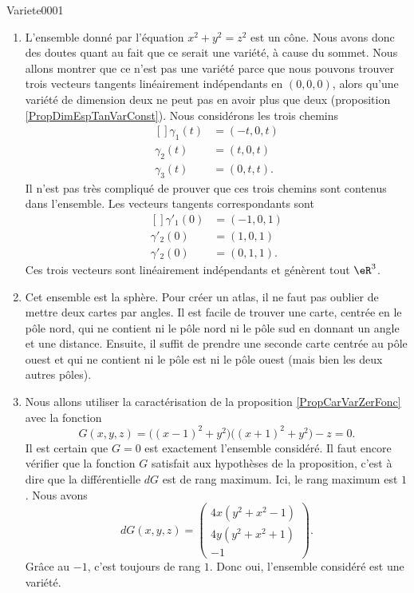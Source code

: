\begin{corrige}{Variete0001}
\begin{enumerate}
		\item
			L'ensemble donné par l'équation $x^2+y^2=z^2$ est un cône. Nous avons donc des doutes quant au fait que ce serait une variété, à cause du sommet.
			Nous allons montrer que ce n'est pas une variété parce que nous pouvons trouver trois vecteurs tangents linéairement indépendants en $(0,0,0)$, alors qu'une variété de dimension deux ne peut pas en avoir plus que deux (proposition \ref{PropDimEspTanVarConst}). Nous considérons les trois chemins
			\begin{equation}
				\begin{aligned}[]
					\gamma_1(t)&=(-t,0,t)\\
					\gamma_2(t)&=(t,0,t)\\
					\gamma_3(t)&=(0,t,t).
				\end{aligned}
			\end{equation}
			Il n'est pas très compliqué de prouver que ces trois chemins sont contenus dans l'ensemble. Les vecteurs tangents correspondants sont
			\begin{equation}
				\begin{aligned}[]
					\gamma'_1(0)&=(-1,0,1)\\
					\gamma'_2(0)&=(1,0,1)\\
					\gamma'_2(0)&=(0,1,1).
				\end{aligned}
			\end{equation}
			Ces trois vecteurs sont linéairement indépendants et génèrent tout $\eR^3$.

		\item
			Cet ensemble est la sphère. Pour créer un atlas, il ne faut pas oublier de mettre deux cartes par angles. Il est facile de trouver une carte, centrée en le pôle nord, qui ne contient ni le pôle nord ni le pôle sud en donnant un angle et une distance. Ensuite, il suffit de prendre une seconde carte centrée au pôle ouest et qui ne contient ni le pôle est ni le pôle ouest (mais bien les deux autres pôles).

		\item
			Nous allons utiliser la caractérisation de la proposition \ref{PropCarVarZerFonc} avec la fonction
			\begin{equation}
				G(x,y,z)=\big( (x-1)^2+y^2 \big)\big( (x+1)^2+y^2 \big)-z=0.
			\end{equation}
			Il est certain que $G=0$ est exactement l'ensemble considéré. Il faut encore vérifier que la fonction $G$ satisfait aux hypothèses de la proposition, c'est à dire que la différentielle $dG$ est de rang maximum. Ici, le rang maximum est $1$. Nous avons
			\begin{equation}
				dG(x,y,z)=
				\begin{pmatrix}
					4x(y^2+x^2-1)	\\ 
					4y(y^2+x^2+1)	\\ 
					-1	
				\end{pmatrix}.
			\end{equation}
			Grâce au $-1$, c'est toujours de rang $1$. Donc oui, l'ensemble considéré est une variété.


\end{enumerate}
\end{corrige}
